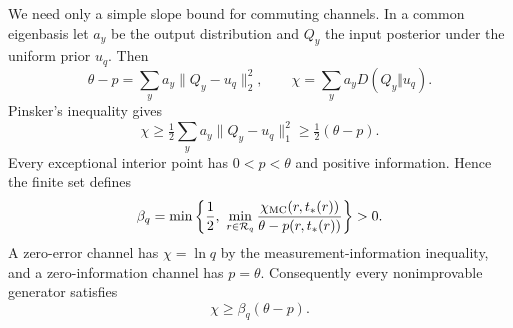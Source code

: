 \documentclass[12pt,letterpaper,onecolumn]{article}
\theoremstyle{definition}
\theoremstyle{remark}
\begin{document}
We need only a simple slope bound for commuting channels. In a common eigenbasis let \(a_y\) be the output distribution and \(Q_y\) the input posterior under the uniform prior \(u_q\). Then
\[
\theta-p=\sum_y a_y\|Q_y-u_q\|_2^2,\qquad
\chi=\sum_y a_yD(Q_y\Vert u_q).
\]
Pinsker's inequality gives
\begin{equation}\label{eq:commutingslope}
\chi\ge\tfrac12\sum_y a_y\|Q_y-u_q\|_1^2
\ge\tfrac12(\theta-p).
\end{equation}
Every exceptional interior point has \(0<p<\theta\) and positive information. Hence the finite set defines
\begin{equation}\label{eq:beta}
\beta_q=\min\left\{\frac12,\
\min_{r\in\mathcal R_q}
\frac{\chi_{\rm MC}(r,t_*(r))}{\theta-p(r,t_*(r))}\right\}>0.
\end{equation}
A zero-error channel has \(\chi=\ln q\) by the measurement-information inequality, and a zero-information channel has \(p=\theta\). Consequently every nonimprovable generator satisfies
\begin{equation}\label{eq:slope}
\chi\ge\beta_q(\theta-p).
\end{equation}
\end{document}
